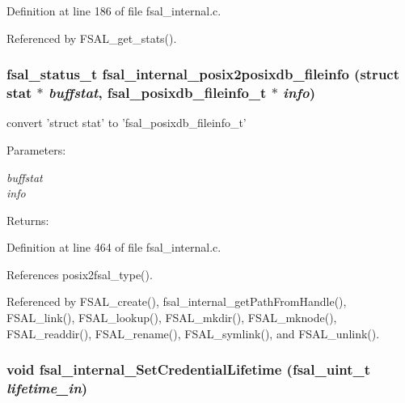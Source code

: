 Definition at line 186 of file fsal\_\-internal.c.

Referenced by FSAL\_\-get\_\-stats().
\subsubsection[{fsal\_\-internal\_\-posix2posixdb\_\-fileinfo}]{\setlength{\rightskip}{0pt plus 5cm}fsal\_\-status\_\-t fsal\_\-internal\_\-posix2posixdb\_\-fileinfo (struct stat $\ast$ {\em buffstat}, \/  fsal\_\-posixdb\_\-fileinfo\_\-t $\ast$ {\em info})}\label{fsal__internal_8c_74cafedfe428119905b75096553c05bb}


convert 'struct stat' to 'fsal\_\-posixdb\_\-fileinfo\_\-t' 

\begin{Desc}
\item[Parameters:]
\begin{description}
\item[{\em buffstat}]\item[{\em info}]\end{description}
\end{Desc}
\begin{Desc}
\item[Returns:]\end{Desc}


Definition at line 464 of file fsal\_\-internal.c.

References posix2fsal\_\-type().

Referenced by FSAL\_\-create(), fsal\_\-internal\_\-getPathFromHandle(), FSAL\_\-link(), FSAL\_\-lookup(), FSAL\_\-mkdir(), FSAL\_\-mknode(), FSAL\_\-readdir(), FSAL\_\-rename(), FSAL\_\-symlink(), and FSAL\_\-unlink().
\subsubsection[{fsal\_\-internal\_\-SetCredentialLifetime}]{\setlength{\rightskip}{0pt plus 5cm}void fsal\_\-internal\_\-SetCredentialLifetime (fsal\_\-uint\_\-t {\em lifetime\_\-in})}\label{fsal__internal_8c_52fbd60f6f8f222868f133a1ca585bd1}


